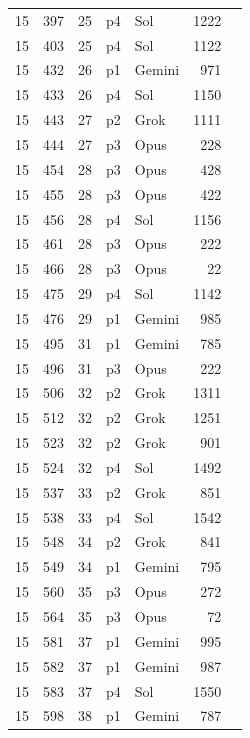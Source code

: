 \begin{longtable}{r r r l l r L{2.2in}}
15 & 397 & 25 & p4 & Sol & 1222 &  \\
15 & 403 & 25 & p4 & Sol & 1122 &  \\
15 & 432 & 26 & p1 & Gemini & 971 &  \\
15 & 433 & 26 & p4 & Sol & 1150 &  \\
15 & 443 & 27 & p2 & Grok & 1111 &  \\
15 & 444 & 27 & p3 & Opus & 228 &  \\
15 & 454 & 28 & p3 & Opus & 428 &  \\
15 & 455 & 28 & p3 & Opus & 422 &  \\
15 & 456 & 28 & p4 & Sol & 1156 &  \\
15 & 461 & 28 & p3 & Opus & 222 &  \\
15 & 466 & 28 & p3 & Opus & 22 &  \\
15 & 475 & 29 & p4 & Sol & 1142 &  \\
15 & 476 & 29 & p1 & Gemini & 985 &  \\
15 & 495 & 31 & p1 & Gemini & 785 &  \\
15 & 496 & 31 & p3 & Opus & 222 &  \\
15 & 506 & 32 & p2 & Grok & 1311 &  \\
15 & 512 & 32 & p2 & Grok & 1251 &  \\
15 & 523 & 32 & p2 & Grok & 901 &  \\
15 & 524 & 32 & p4 & Sol & 1492 &  \\
15 & 537 & 33 & p2 & Grok & 851 &  \\
15 & 538 & 33 & p4 & Sol & 1542 &  \\
15 & 548 & 34 & p2 & Grok & 841 &  \\
15 & 549 & 34 & p1 & Gemini & 795 &  \\
15 & 560 & 35 & p3 & Opus & 272 &  \\
15 & 564 & 35 & p3 & Opus & 72 &  \\
15 & 581 & 37 & p1 & Gemini & 995 &  \\
15 & 582 & 37 & p1 & Gemini & 987 &  \\
15 & 583 & 37 & p4 & Sol & 1550 &  \\
15 & 598 & 38 & p1 & Gemini & 787 &  \\

\end{longtable}
